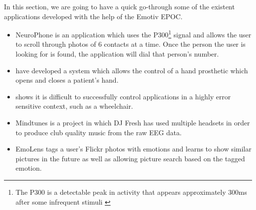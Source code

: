 In this section, we are going to have a quick go-through some of the existent applications developed with the help of the Emotiv EPOC.

\begin{itemize}
	\item NeuroPhone \cite{neurophone} is an application which uses the P300\footnote{The P300 is a detectable peak in activity that appears approximately 300ms
after some infrequent stimuli \cite{hons1201}} signal and allows the user to scroll through photos of 6 contacts at a time. Once the person the user is looking for is found, the application will dial that person's number.
	\item \cite{handOrthotic} have developed a system which allows the control of a hand prosthetic which opens and closes a patient's hand.
	\item \cite{wheelchairEEG} shows it is difficult to successfully control applications in a highly error sensitive context, such as a wheelchair. 
	\item Mindtunes \cite{mindtunes} is a project in which DJ Fresh has used multiple headsets in order to produce club quality music from the raw EEG data.   
	\item EmoLens \cite{emoLens} tags a user's Flickr photos with emotions and learns to show similar pictures in the future as well as allowing picture search based on the tagged emotion.
\end{itemize}